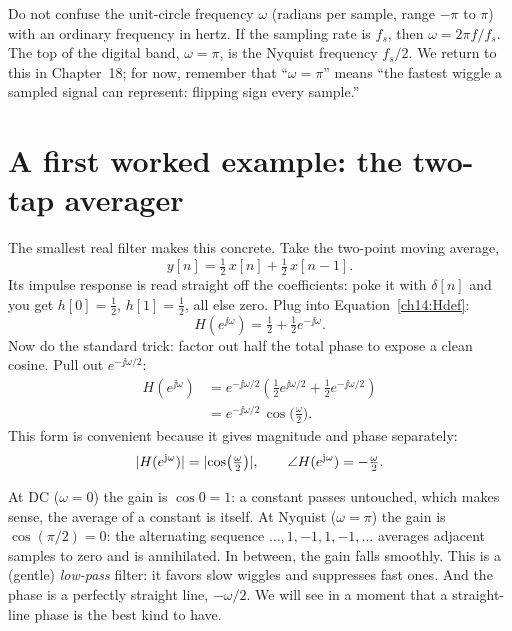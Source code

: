 \begin{trapbox}
Do not confuse the unit-circle frequency $\omega$ (radians per sample, range
$-\pi$ to $\pi$) with an ordinary frequency in hertz. If the sampling rate is
$f_s$, then $\omega = 2\pi f / f_s$. The top of the digital band, $\omega=\pi$,
is the Nyquist frequency $f_s/2$. We return to this in Chapter~18; for now,
remember that ``$\omega = \pi$'' means ``the fastest wiggle a sampled
signal can represent: flipping sign every sample.''
\end{trapbox}

\section{A first worked example: the two-tap averager}
\label{ch14:avg}

The smallest real filter makes this concrete. Take the
two-point moving average,
\[
  y[n] = \tfrac12\,x[n] + \tfrac12\,x[n-1].
\]
Its impulse response is read straight off the coefficients: poke it with
$\delta[n]$ and you get $h[0]=\tfrac12$, $h[1]=\tfrac12$, all else zero. Plug
into Equation~\eqref{ch14:Hdef}:
\[
  H(e^{\jj\omega}) = \tfrac12 + \tfrac12 e^{-\jj\omega}.
\]
Now do the standard trick: factor out half the total phase to expose a clean
cosine. Pull out $e^{-\jj\omega/2}$:
\begin{align*}
  H(e^{\jj\omega})
   &= e^{-\jj\omega/2}\left(\tfrac12 e^{\jj\omega/2} + \tfrac12 e^{-\jj\omega/2}\right) \\
   &= e^{-\jj\omega/2}\,\cos\!\big(\tfrac{\omega}{2}\big).
\end{align*}
This form is convenient because it gives magnitude and phase separately:
\[
  \lvert H(e^{\mathrm{j}\omega})\rvert = \lvert\cos\!\big(\tfrac{\omega}{2}\big)\rvert,
  \qquad
  \angle H(e^{\mathrm{j}\omega}) = -\tfrac{\omega}{2}.
\]

At DC ($\omega=0$) the gain is $\cos 0 = 1$: a constant passes
untouched, which makes sense, the average of a constant is itself. At Nyquist
($\omega=\pi$) the gain is $\cos(\pi/2)=0$: the alternating sequence
$\dots,1,-1,1,-1,\dots$ averages adjacent samples to zero and is annihilated.
In between, the gain falls smoothly. This is a (gentle) \emph{low-pass} filter:
it favors slow wiggles and suppresses fast ones. And the phase is a perfectly
straight line, $-\omega/2$. We will see in a moment that a straight-line phase
is the best kind to have.

